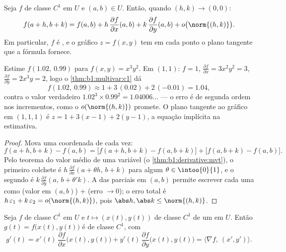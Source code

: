 \begin{theorem}\label{thm:b1:multivar:c1}
Seja $f$ de classe $C^1$ em $U$ e $(a,b) \in U$. Então, quando $(h, k) \to
(0,0)$:
\[
f(a + h, b + k) = f(a, b)
+ h\,\frac{\partial f}{\partial x}(a,b)
+ k\,\frac{\partial f}{\partial y}(a,b)
+ o\bigl(\norm{(h,k)}\bigr) .
\]
Em particular, $f$ é , e o gráfico $z = f(x,y)$ tem em cada ponto o
plano tangente que a fórmula fornece.
\end{theorem}

\begin{example}
\label{ex:b1:multivar:linapprox}
Estime $f(1.02,\ 0.99)$ para $f(x, y) = x^3y^2$. Em $(1, 1)$: $f = 1$, $\frac{\partial f}{\partial x} = 3x^2y^2 = 3$, $\frac{\partial f}{\partial y} = 2x^3y = 2$, logo o
\cref{thm:b1:multivar:c1} dá
\[
f(1.02,\ 0.99) \approx 1 + 3\,(0.02) + 2\,(-0.01) = 1.04 ,
\]
contra o valor verdadeiro $1.02^3 \times 0.99^2 = 1.04006\dots$ --- o erro é de segunda ordem nos
incrementos, como o $o(\norm{(h,k)})$ promete. O plano tangente ao gráfico em
$(1, 1, 1)$ é $z = 1 + 3(x - 1) + 2(y - 1)$, a equação implícita na estimativa.
\end{example}

\begin{proof}
Mova uma coordenada de cada vez:
\[
f(a+h, b+k) - f(a,b)
= \bigl[f(a+h, b+k) - f(a, b+k)\bigr] + \bigl[f(a, b+k) -
f(a,b)\bigr].
\]
Pelo teorema do valor médio de uma variável (o \cref{thm:b1:derivative:mvt}), o primeiro
colchete é $h\,
\frac{\partial f}{\partial x}(a + \theta h,\, b + k)$ para algum $\theta \in \intoo{0}{1}$, e o segundo é $k\,\frac{\partial
f}{\partial y}(a,\, b + \theta' k)$. A 
das parciais em $(a,b)$ permite escrever cada uma como (valor em
$(a,b)$) $+$ (erro $\to 0$); o erro total é $h\,\varepsilon_1 +
k\,\varepsilon_2 = o(\norm{(h,k)})$, pois $\abs h, \abs k \leq
\norm{(h,k)}$.
\end{proof}

\begin{theorem}\label{thm:b1:multivar:chain}
Seja $f$ de classe $C^1$ em $U$ e $t \mapsto (x(t), y(t))$ de classe $C^1$ de um
 em $U$. Então $g(t) = f\bigl(x(t), y(t)\bigr)$ é de classe $C^1$, com
\[
g'(t) = x'(t)\,\frac{\partial f}{\partial x}\bigl(x(t),y(t)\bigr)
+ y'(t)\,\frac{\partial f}{\partial y}\bigl(x(t),y(t)\bigr)
= \bigl\langle \nabla f,\ (x', y')\bigr\rangle .
\]
\end{theorem}

